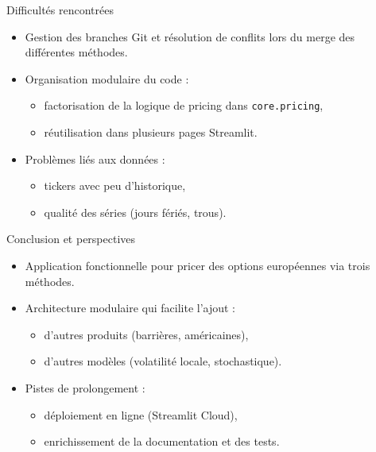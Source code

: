 \documentclass[aspectratio=169]{beamer}
\begin{document}
\begin{frame}{Difficult\'es rencontr\'ees}
  \begin{itemize}
    \item Gestion des branches Git et r\'esolution de conflits lors du merge des diff\'erentes m\'ethodes.
    \item Organisation modulaire du code :
    \begin{itemize}
      \item factorisation de la logique de pricing dans \texttt{core.pricing},
      \item r\'eutilisation dans plusieurs pages Streamlit.
    \end{itemize}
    \item Probl\`emes li\'es aux donn\'ees :
    \begin{itemize}
      \item tickers avec peu d'historique,
      \item qualit\'e des s\'eries (jours f\'eri\'es, trous).
    \end{itemize}
  \end{itemize}
\end{frame}

\begin{frame}{Conclusion et perspectives}
  \begin{itemize}
    \item Application fonctionnelle pour pricer des options europ\'eennes via trois m\'ethodes.
    \item Architecture modulaire qui facilite l'ajout :
    \begin{itemize}
      \item d'autres produits (barri\`eres, am\'ericaines),
      \item d'autres mod\`eles (volatilit\'e locale, stochastique).
    \end{itemize}
    \item Pistes de prolongement :
    \begin{itemize}
      \item d\'eploiement en ligne (Streamlit Cloud),
      \item enrichissement de la documentation et des tests.
    \end{itemize}
  \end{itemize}
\end{frame}
\end{document}

